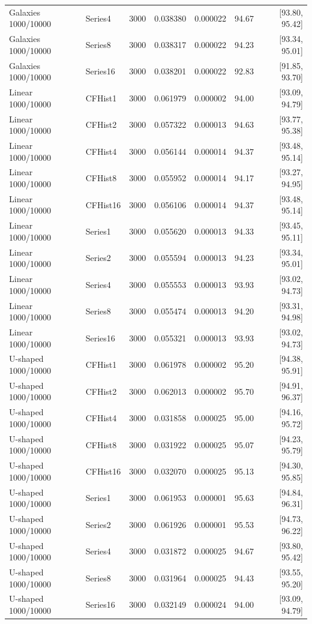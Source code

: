 \begin{longtable}{llrrrrr}
Galaxies 1000/10000 & Series4 & 3000 & 0.038380 & 0.000022 & 94.67 & [93.80, 95.42]\\
Galaxies 1000/10000 & Series8 & 3000 & 0.038317 & 0.000022 & 94.23 & [93.34, 95.01]\\
Galaxies 1000/10000 & Series16 & 3000 & 0.038201 & 0.000022 & 92.83 & [91.85, 93.70]\\
Linear 1000/10000 & CFHist1 & 3000 & 0.061979 & 0.000002 & 94.00 & [93.09, 94.79]\\
Linear 1000/10000 & CFHist2 & 3000 & 0.057322 & 0.000013 & 94.63 & [93.77, 95.38]\\
Linear 1000/10000 & CFHist4 & 3000 & 0.056144 & 0.000014 & 94.37 & [93.48, 95.14]\\
Linear 1000/10000 & CFHist8 & 3000 & 0.055952 & 0.000014 & 94.17 & [93.27, 94.95]\\
Linear 1000/10000 & CFHist16 & 3000 & 0.056106 & 0.000014 & 94.37 & [93.48, 95.14]\\
Linear 1000/10000 & Series1 & 3000 & 0.055620 & 0.000013 & 94.33 & [93.45, 95.11]\\
Linear 1000/10000 & Series2 & 3000 & 0.055594 & 0.000013 & 94.23 & [93.34, 95.01]\\
Linear 1000/10000 & Series4 & 3000 & 0.055553 & 0.000013 & 93.93 & [93.02, 94.73]\\
Linear 1000/10000 & Series8 & 3000 & 0.055474 & 0.000013 & 94.20 & [93.31, 94.98]\\
Linear 1000/10000 & Series16 & 3000 & 0.055321 & 0.000013 & 93.93 & [93.02, 94.73]\\
U-shaped 1000/10000 & CFHist1 & 3000 & 0.061978 & 0.000002 & 95.20 & [94.38, 95.91]\\
U-shaped 1000/10000 & CFHist2 & 3000 & 0.062013 & 0.000002 & 95.70 & [94.91, 96.37]\\
U-shaped 1000/10000 & CFHist4 & 3000 & 0.031858 & 0.000025 & 95.00 & [94.16, 95.72]\\
U-shaped 1000/10000 & CFHist8 & 3000 & 0.031922 & 0.000025 & 95.07 & [94.23, 95.79]\\
U-shaped 1000/10000 & CFHist16 & 3000 & 0.032070 & 0.000025 & 95.13 & [94.30, 95.85]\\
U-shaped 1000/10000 & Series1 & 3000 & 0.061953 & 0.000001 & 95.63 & [94.84, 96.31]\\
U-shaped 1000/10000 & Series2 & 3000 & 0.061926 & 0.000001 & 95.53 & [94.73, 96.22]\\
U-shaped 1000/10000 & Series4 & 3000 & 0.031872 & 0.000025 & 94.67 & [93.80, 95.42]\\
U-shaped 1000/10000 & Series8 & 3000 & 0.031964 & 0.000025 & 94.43 & [93.55, 95.20]\\
U-shaped 1000/10000 & Series16 & 3000 & 0.032149 & 0.000024 & 94.00 & [93.09, 94.79]\\
\bottomrule
\end{longtable}